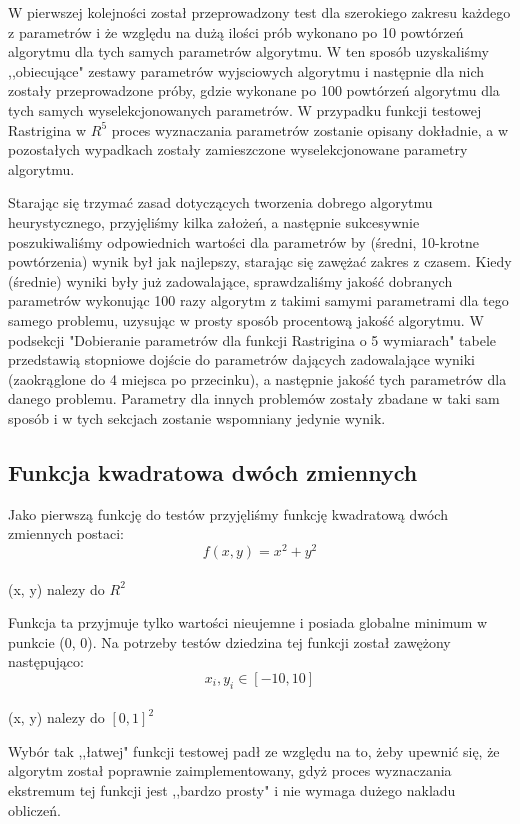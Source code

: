 \documentclass[twoside]{projektInzynierskiMS1}
\newcommand{\si}{ś}
\begin{document}
W pierwszej kolejno\si ci został przeprowadzony test dla szerokiego zakresu każdego z parametrów i że względu na dużą ilo\si ci prób wykonano po 10 powtórzeń algorytmu dla tych samych parametrów algorytmu. W ten sposób uzyskali\si my ,,obiecujące" zestawy parametrów wyjsciowych algorytmu i następnie dla nich zostały przeprowadzone próby, gdzie wykonane po 100 powtórzeń algorytmu dla tych samych wyselekcjonowanych parametrów. W przypadku funkcji testowej Rastrigina w $R^5$ proces wyznaczania parametrów zostanie opisany dokładnie, a w pozostałych wypadkach zostały zamieszczone wyselekcjonowane parametry algorytmu.












Starając się trzymać zasad dotyczących tworzenia dobrego algorytmu heurystycznego, przyjęli\si my kilka założeń, a następnie sukcesywnie poszukiwali\si my odpowiednich warto\si ci dla parametrów by (\si redni, 10-krotne powtórzenia) wynik był jak najlepszy, starając się zawężać zakres z czasem. Kiedy (\si rednie) wyniki były już zadowalające, sprawdzali\si my jako\si ć dobranych parametrów wykonując 100 razy algorytm z takimi samymi parametrami dla tego samego problemu, uzysując w prosty sposób procentową jako\si ć algorytmu. W podsekcji "Dobieranie parametrów dla funkcji Rastrigina o 5 wymiarach" tabele przedstawią stopniowe doj\si cie do parametrów dających zadowalające wyniki (zaokrąglone do 4 miejsca po przecinku), a następnie jako\si ć tych parametrów dla danego problemu. Parametry dla innych problemów zostały zbadane w taki sam sposób i w tych sekcjach zostanie wspomniany jedynie wynik.

	\subsection{Funkcja kwadratowa dwóch zmiennych}
	Jako pierwszą funkcję do testów przyjęli\si my funkcję kwadratową dwóch zmiennych postaci:
\[f(x, y) = x^2 + y^2 \] \\(x, y) nalezy do $R^2$

Funkcja ta przyjmuje tylko warto\si ci nieujemne i posiada globalne minimum w punkcie (0, 0). Na potrzeby testów dziedzina tej funkcji został zawężony następująco:
\[x_i, y_i \in [-10, 10] \] \\ 
(x, y) nalezy do $[0,1]^2$

Wybór tak ,,łatwej" funkcji testowej padł ze względu na to, żeby upewnić się, że algorytm został poprawnie zaimplementowany, gdyż proces wyznaczania ekstremum tej funkcji jest ,,bardzo prosty" i nie wymaga dużego nakladu obliczeń.
\end{document}
